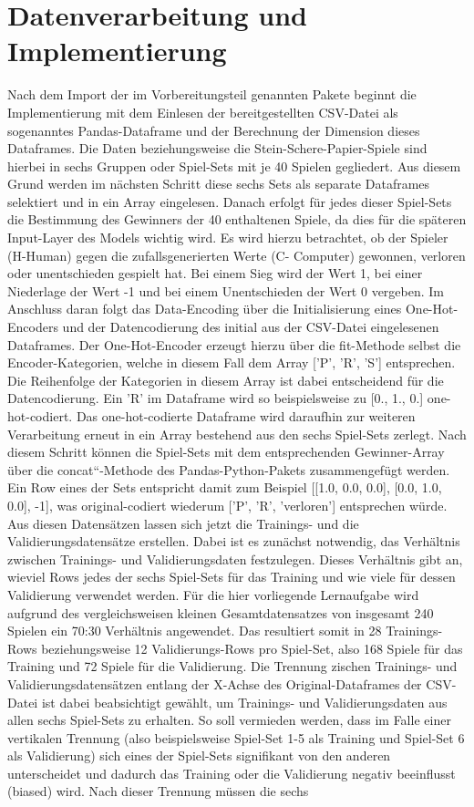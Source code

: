 \documentclass[thesis=paper,fancy]{hsmw-thesis}
\begin{document}
\section{Datenverarbeitung und Implementierung}
Nach dem Import der im Vorbereitungsteil genannten Pakete beginnt die Implementierung mit dem Einlesen der bereitgestellten CSV-Datei als sogenanntes Pandas-Dataframe und der Berechnung der Dimension dieses Dataframes. Die Daten beziehungsweise die Stein-Schere-Papier-Spiele sind hierbei in sechs Gruppen oder Spiel-Sets mit je 40 Spielen gegliedert. Aus diesem Grund werden im nächsten Schritt diese sechs Sets als separate Dataframes selektiert und in ein Array eingelesen. Danach erfolgt für jedes dieser Spiel-Sets die Bestimmung des Gewinners der 40 enthaltenen Spiele, da dies für die späteren Input-Layer des Models wichtig wird. Es wird hierzu betrachtet, ob der Spieler (\glqq H\grqq -Human) gegen die zufallsgenerierten Werte (\glqq C\grqq - Computer) gewonnen, verloren oder unentschieden gespielt hat. Bei einem Sieg wird der Wert 1, bei einer Niederlage der Wert -1 und bei einem Unentschieden der Wert 0 vergeben. Im Anschluss daran folgt das Data-Encoding über die Initialisierung eines One-Hot-Encoders und der Datencodierung des initial aus der CSV-Datei eingelesenen Dataframes. Der One-Hot-Encoder erzeugt hierzu über die \glqq fit\grqq-Methode selbst die Encoder-Kategorien, welche in diesem Fall dem Array ['P', 'R', 'S'] entsprechen. Die Reihenfolge der Kategorien in diesem Array ist dabei entscheidend für die Datencodierung. Ein 'R' im Dataframe wird so beispielsweise zu [0., 1., 0.] one-hot-codiert. Das one-hot-codierte Dataframe wird daraufhin zur weiteren Verarbeitung erneut in ein Array bestehend aus den sechs Spiel-Sets zerlegt. Nach diesem Schritt können die Spiel-Sets mit dem entsprechenden Gewinner-Array über die \glqq concat“-Methode des Pandas-Python-Pakets zusammengefügt werden. Ein Row eines der Sets entspricht damit zum Beispiel [[1.0, 0.0, 0.0], [0.0, 1.0, 0.0], -1], was original-codiert wiederum ['P', 'R', 'verloren'] entsprechen würde. Aus diesen Datensätzen lassen sich jetzt die Trainings- und die Validierungsdatensätze erstellen. Dabei ist es zunächst notwendig, das Verhältnis zwischen Trainings- und Validierungsdaten festzulegen. Dieses Verhältnis gibt an, wieviel Rows jedes der sechs Spiel-Sets für das Training und wie viele für dessen Validierung verwendet werden. Für die hier vorliegende Lernaufgabe wird aufgrund des vergleichsweisen kleinen Gesamtdatensatzes von insgesamt 240 Spielen ein 70:30 Verhältnis angewendet. Das resultiert somit in 28 Trainings-Rows beziehungsweise 12 Validierungs-Rows pro Spiel-Set, also 168 Spiele für das Training und 72 Spiele für die Validierung. Die Trennung zischen Trainings- und Validierungsdatensätzen entlang der X-Achse des Original-Dataframes der CSV-Datei ist dabei beabsichtigt gewählt, um Trainings- und Validierungsdaten aus allen sechs Spiel-Sets zu erhalten. So soll vermieden werden, dass im Falle einer vertikalen Trennung (also beispielsweise Spiel-Set 1-5 als Training und Spiel-Set 6 als Validierung) sich eines der Spiel-Sets signifikant von den anderen unterscheidet und dadurch das Training oder die Validierung negativ beeinflusst (biased) wird. Nach dieser Trennung müssen die sechs 
\end{document}
